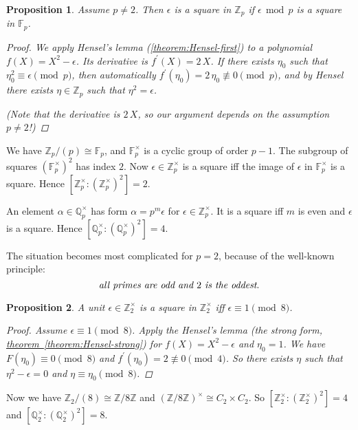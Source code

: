 \documentclass{article}
\newcommand{\isom}{\cong}
\newcommand{\ZZ}{\mathbb{Z}}
\newcommand{\FF}{\mathbb{F}}
\newcommand{\QQ}{\mathbb{Q}}
\renewcommand{\mod}{\mathop{\,\mathrm{mod}\,}}
\newcommand{\refref}[2]{\hyperref[#2]{#1~\ref*{#2}}}
\theoremstyle{myplain}
\newtheorem{proposition}{Proposition}[section]
\theoremstyle{mydefinition}
\begin{document}
\begin{proposition}
  Assume $p \ne 2$. Then $\epsilon$ is a square in $\ZZ_p$ if $\epsilon \mod p$
  is a square in $\FF_p$.

  \begin{proof}
    We apply Hensel's lemma (\ref{theorem:Hensel-first}) to a polynomial
    $f (X) = X^2 - \epsilon$. Its derivative is $f^\prime (X) = 2\,X$. If there
    exists $\eta_0$ such that $\eta_0^2 \equiv \epsilon \pmod{p}$, then
    automatically $f^\prime (\eta_0) = 2\,\eta_0 \not \equiv 0 \pmod{p}$, and by
    Hensel there exists $\eta \in \ZZ_p$ such that $\eta^2 = \epsilon$.

    (Note that the derivative is $2\,X$, so our argument depends on the
    assumption $p \ne 2$!)
  \end{proof}
\end{proposition}

We have $\ZZ_p/(p) \isom \FF_p$, and $\FF_p^\times$ is a cyclic group of order
$p-1$. The subgroup of squares $(\FF_p^\times)^2$ has index $2$. Now
$\epsilon \in \ZZ_p^\times$ is a square iff the image of $\epsilon$ in
$\FF_p^\times$ is a square. Hence $[\ZZ_p^\times : (\ZZ_p^\times)^2] = 2$.

An element $\alpha \in \QQ_p^\times$ has form $\alpha = p^m \epsilon$ for
$\epsilon \in \ZZ_p^\times$. It is a square iff $m$ is even and $\epsilon$ is a
square. Hence $[\QQ_p^\times : (\QQ_p^\times)^2] = 4$.

\vspace{1em}

The situation becomes most complicated for $p = 2$, because of the well-known
principle:
\[ \text{\it all primes are odd and }2\text{\it{} is the oddest}. \]

\begin{proposition}
  A unit $\epsilon \in \ZZ_2^\times$ is a square in $\ZZ_2^\times$ iff
  $\epsilon \equiv 1 \pmod{8}$.

  \begin{proof}
    Assume $\epsilon \equiv 1 \pmod{8}$. Apply the Hensel's lemma (the strong
    form, \refref{theorem}{theorem:Hensel-strong}) for $f (X) = X^2 - \epsilon$
    and $\eta_0 = 1$. We have $F (\eta_0) \equiv 0 \pmod{8}$ and
    $f^\prime (\eta_0) = 2 \not\equiv 0 \pmod{4}$. So there exists $\eta$ such
    that $\eta^2 - \epsilon = 0$ and $\eta \equiv \eta_0 \pmod{8}$.
  \end{proof}
\end{proposition}

Now we have $\ZZ_2 / (8) \isom \ZZ/8\ZZ$ and
$(\ZZ/8\ZZ)^\times \isom C_2 \times C_2$. So
$[\ZZ_2^\times : (\ZZ_2^\times)^2] = 4$ and
$[\QQ_2^\times : (\QQ_2^\times)^2] = 8$.
\end{document}

